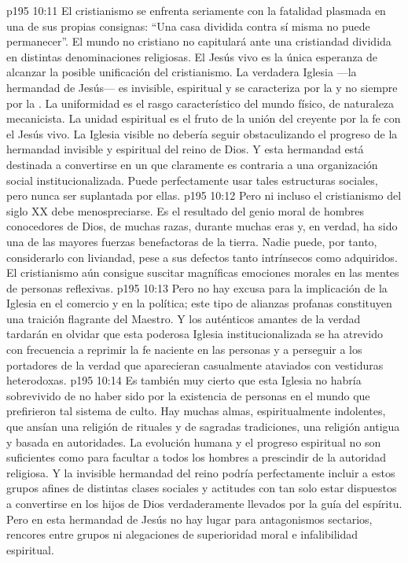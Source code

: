 \vs p195 10:11 El cristianismo se enfrenta seriamente con la fatalidad plasmada en una de sus propias consignas: “Una casa dividida contra sí misma no puede permanecer”. El mundo no cristiano no capitulará ante una cristiandad dividida en distintas denominaciones religiosas. El Jesús vivo es la única esperanza de alcanzar la posible unificación del cristianismo. La verdadera Iglesia ---la hermandad de Jesús--- es invisible, espiritual y se caracteriza por la  y no siempre por la . La uniformidad es el rasgo característico del mundo físico, de naturaleza mecanicista. La unidad espiritual es el fruto de la unión del creyente por la fe con el Jesús vivo. La Iglesia visible no debería seguir obstaculizando el progreso de la hermandad invisible y espiritual del reino de Dios. Y esta hermandad está destinada a convertirse en un  que claramente es contraria a una organización social institucionalizada. Puede perfectamente usar tales estructuras sociales, pero nunca ser suplantada por ellas.
\vs p195 10:12 Pero ni incluso el cristianismo del siglo XX debe menospreciarse. Es el resultado del genio moral de hombres conocedores de Dios, de muchas razas, durante muchas eras y, en verdad, ha sido una de las mayores fuerzas benefactoras de la tierra. Nadie puede, por tanto, considerarlo con liviandad, pese a sus defectos tanto intrínsecos como adquiridos. El cristianismo aún consigue suscitar magníficas emociones morales en las mentes de personas reflexivas.
\vs p195 10:13 Pero no hay excusa para la implicación de la Iglesia en el comercio y en la política; este tipo de alianzas profanas constituyen una traición flagrante del Maestro. Y los auténticos amantes de la verdad tardarán en olvidar que esta poderosa Iglesia institucionalizada se ha atrevido con frecuencia a reprimir la fe naciente en las personas y a perseguir a los portadores de la verdad que aparecieran casualmente ataviados con vestiduras heterodoxas.
\vs p195 10:14 Es también muy cierto que esta Iglesia no habría sobrevivido de no haber sido por la existencia de personas en el mundo que prefirieron tal sistema de culto. Hay muchas almas, espiritualmente indolentes, que ansían una religión de rituales y de sagradas tradiciones, una religión antigua y basada en autoridades. La evolución humana y el progreso espiritual no son suficientes como para facultar a todos los hombres a prescindir de la autoridad religiosa. Y la invisible hermandad del reino podría perfectamente incluir a estos grupos afines de distintas clases sociales y actitudes con tan solo estar dispuestos a convertirse en los hijos de Dios verdaderamente llevados por la guía del espíritu. Pero en esta hermandad de Jesús no hay lugar para antagonismos sectarios, rencores entre grupos ni alegaciones de superioridad moral e infalibilidad espiritual.
